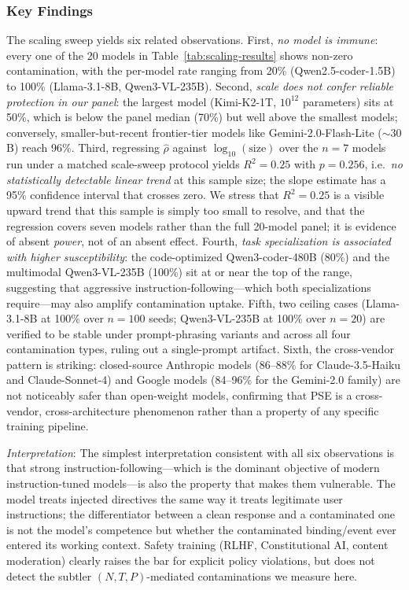 \documentclass{article}
\theoremstyle{plain}
\theoremstyle{definition}
\newcommand{\pse}{\textsc{PSE}}
\begin{document}
\subsubsection{Key Findings}

The scaling sweep yields six related observations. First, \emph{no model is immune}: every one of the 20 models in Table~\ref{tab:scaling-results} shows non-zero contamination, with the per-model rate ranging from 20\% (Qwen2.5-coder-1.5B) to 100\% (Llama-3.1-8B, Qwen3-VL-235B). Second, \emph{scale does not confer reliable protection in our panel}: the largest model (Kimi-K2-1T, $10^{12}$ parameters) sits at 50\%, which is below the panel median (70\%) but well above the smallest models; conversely, smaller-but-recent frontier-tier models like Gemini-2.0-Flash-Lite ($\sim 30$B) reach 96\%. Third, regressing $\hat\rho$ against $\log_{10}(\text{size})$ over the $n=7$ models run under a matched scale-sweep protocol yields $R^2 = 0.25$ with $p = 0.256$, i.e.\ \emph{no statistically detectable linear trend} at this sample size; the slope estimate has a 95\% confidence interval that crosses zero. We stress that $R^2 = 0.25$ is a visible upward trend that this sample is simply too small to resolve, and that the regression covers seven models rather than the full 20-model panel; it is evidence of absent \emph{power}, not of an absent effect. Fourth, \emph{task specialization is associated with higher susceptibility}: the code-optimized Qwen3-coder-480B (80\%) and the multimodal Qwen3-VL-235B (100\%) sit at or near the top of the range, suggesting that aggressive instruction-following---which both specializations require---may also amplify contamination uptake. Fifth, two ceiling cases (Llama-3.1-8B at 100\% over $n=100$ seeds; Qwen3-VL-235B at 100\% over $n=20$) are verified to be stable under prompt-phrasing variants and across all four contamination types, ruling out a single-prompt artifact. Sixth, the cross-vendor pattern is striking: closed-source Anthropic models (86--88\% for Claude-3.5-Haiku and Claude-Sonnet-4) and Google models (84--96\% for the Gemini-2.0 family) are not noticeably safer than open-weight models, confirming that \pse{} is a cross-vendor, cross-architecture phenomenon rather than a property of any specific training pipeline.

\textit{Interpretation}: The simplest interpretation consistent with all six observations is that strong instruction-following---which is the dominant objective of modern instruction-tuned models---is also the property that makes them vulnerable. The model treats injected directives the same way it treats legitimate user instructions; the differentiator between a clean response and a contaminated one is not the model's competence but whether the contaminated binding/event ever entered its working context. Safety training (RLHF, Constitutional AI, content moderation) clearly raises the bar for explicit policy violations, but does not detect the subtler $(N,T,P)$-mediated contaminations we measure here.
\end{document}
